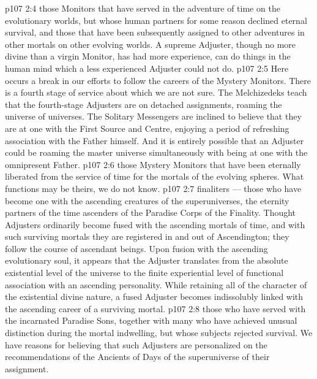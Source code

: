 \vs p107 2:4 \bibnobreakspace {} those Monitors that have served in the adventure of time on the evolutionary worlds, but whose human partners for some reason declined eternal survival, and those that have been subsequently assigned to other adventures in other mortals on other evolving worlds. A supreme Adjuster, though no more divine than a virgin Monitor, has had more experience, can do things in the human mind which a less experienced Adjuster could not do.
\vs p107 2:5 \bibnobreakspace {} Here occurs a break in our efforts to follow the careers of the Mystery Monitors. There is a fourth stage of service about which we are not sure. The Melchizedeks teach that the fourth\hyp{}stage Adjusters are on detached assignments, roaming the universe of universes. The Solitary Messengers are inclined to believe that they are at one with the First Source and Centre, enjoying a period of refreshing association with the Father himself. And it is entirely possible that an Adjuster could be roaming the master universe simultaneously with being at one with the omnipresent Father.
\vs p107 2:6 \bibnobreakspace {} those Mystery Monitors that have been eternally liberated from the service of time for the mortals of the evolving spheres. What functions may be theirs, we do not know.
\vs p107 2:7 \bibnobreakspace {} finaliters --- those who have become one with the ascending creatures of the superuniverses, the eternity partners of the time ascenders of the Paradise Corps of the Finality. Thought Adjusters ordinarily become fused with the ascending mortals of time, and with such surviving mortals they are registered in and out of Ascendington; they follow the course of ascendant beings. Upon fusion with the ascending evolutionary soul, it appears that the Adjuster translates from the absolute existential level of the universe to the finite experiential level of functional association with an ascending personality. While retaining all of the character of the existential divine nature, a fused Adjuster becomes indissolubly linked with the ascending career of a surviving mortal.
\vs p107 2:8 \bibnobreakspace {} those who have served with the incarnated Paradise Sons, together with many who have achieved unusual distinction during the mortal indwelling, but whose subjects rejected survival. We have reasons for believing that such Adjusters are personalized on the recommendations of the Ancients of Days of the superuniverse of their assignment.
